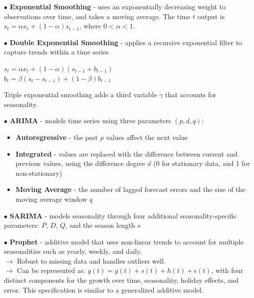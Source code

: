 \documentclass[letterpaper, 10.5pt,landscape]{article}
\begin{document}
\begin{multicols*}{3}
$\bullet$ \textbf{Exponential Smoothing} - uses an exponentially decreasing weight to observations over time, and takes a moving average. The time $t$ output is $s_t = \alpha x_t + (1-\alpha)s_{t-1}$, where  $0 < \alpha < 1$.
\smallskip

$\bullet$ \textbf{Double Exponential Smoothing} - applies a recursive exponential filter to capture trends within a time series
    \begin{center}
    \vspace{-2.5mm}
    $s_t = \alpha x_t + (1-\alpha)(s_{t-1} + b_{t-1})$\\
    $b_t = \beta (s_t - s_{t-1}) + (1-\beta)b_{t-1}$\\
    \vspace{-2mm}
    \end{center}
Triple exponential smoothing adds a third variable
$\gamma$ that accounts for seasonality.
\smallskip

$\bullet$ \textbf{ARIMA} - models time series using three parameters $(p,d,q)$:

\begin{itemize}[label={--},leftmargin=4mm]
\vspace{-3pt}
\item \textbf{Autoregressive} - the past $p$ values affect the next value
\vspace{-3pt}
\item \textbf{Integrated} - values are replaced with the difference between current and previous values, using the difference degree $d$ (0 for stationary data, and 1 for non-stationary)
\vspace{-3pt}
\item \textbf{Moving Average} - the number of lagged forecast errors and the size of the moving average window $q$
\end{itemize}

$\bullet$ \textbf{SARIMA} - models seasonality through four additional seasonality-specific parameters: $P$, $D$, $Q$, and the season length $s$
\smallskip

$\bullet$ \textbf{Prophet} - additive model that uses non-linear trends to account for multiple seasonalities such as yearly, weekly, and daily. \\
$\rightarrow$ Robust to missing data and handles outliers well.\\ 
$\rightarrow$ Can be represented as: $y(t) = g(t) + s(t) + h(t) + \epsilon(t)$, with four distinct components for the growth over time, seasonality, holiday effects, and error. This specification is similar to a generalized additive model.
\smallskip


\end{multicols*}
\end{document}
